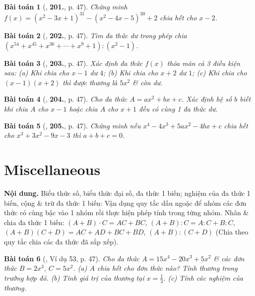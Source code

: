 \documentclass{article}
\numberwithin{equation}{section}
\newtheorem{baitoan}{Bài toán}
\begin{document}
\begin{baitoan}[\cite{Tuyen_Toan_7}, \textbf{201.}, p. 47]
	Chứng minh $f(x) = (x^2 - 3x + 1)^{31} - (x^2 - 4x - 5)^{30} + 2$ chia hết cho $x - 2$.
\end{baitoan}

\begin{baitoan}[\cite{Tuyen_Toan_7}, \textbf{202.}, p. 47]
	Tìm đa thức dư trong phép chia $(x^{54} + x^{45} + x^{36} + \cdots + x^9 + 1):(x^2 - 1)$.
\end{baitoan}

\begin{baitoan}[\cite{Tuyen_Toan_7}, \textbf{203.}, p. 47]
	Xác định đa thức $f(x)$ thỏa mãn cả 3 điều kiện sau: (a) Khi chia cho $x - 1$ dư $4$; (b) Khi chia cho $x + 2$ dư $1$; (c) Khi chia cho $(x - 1)(x + 2)$ thì được thương là $5x^2$ \& còn dư.
\end{baitoan}

\begin{baitoan}[\cite{Tuyen_Toan_7}, \textbf{204.}, p. 47]
	Cho đa thức $A = ax^2 + bx + c$. Xác định hệ số $b$ biết khi chia $A$ cho $x - 1$ hoặc chia $A$ cho $x + 1$ đều có cùng 1 đa thức dư.
\end{baitoan}

\begin{baitoan}[\cite{Tuyen_Toan_7}, \textbf{205.}, p. 47]
	Chứng minh nếu $x^4 - 4x^3 + 5ax^2 - 4bx + c$ chia hết cho $x^3 + 3x^2 - 9x - 3$ thì $a + b + c = 0$.
\end{baitoan}


\section{Miscellaneous}
\textsf{\textbf{Nội dung.} Biểu thức số, biểu thức đại số, đa thức 1 biến; nghiệm của đa thức 1 biến, cộng \& trừ đa thức 1 biến:} Vận dụng quy tắc dấu ngoặc để nhóm các đơn thức có cùng bậc vào 1 nhóm rồi thực hiện phép tính trong từng nhóm. \textsf{Nhân \& chia đa thức 1 biến:} $(A + B)\cdot C = AC + BC$, $(A + B):C = A:C + B:C$, $(A + B)(C + D) = AC + AD + BC + BD$, $(A + B):(C + D)$ (Chia theo quy tắc chia các đa thức đã sắp xếp).

\begin{baitoan}[\cite{Tuyen_Toan_7}, Ví dụ 53, p. 47]
	Cho đa thức $A = 15x^4 - 20x^3 + 5x^2$ \& các đơn thức $B = 2x^3$, $C = 5x^2$. (a) $A$ chia hết cho đơn thức nào? Tính thương trong trường hợp đó. (b) Tính giá trị của thương tại $x = \frac{1}{3}$. (c) Tính các nghiệm của thương.
\end{baitoan}
\end{document}
